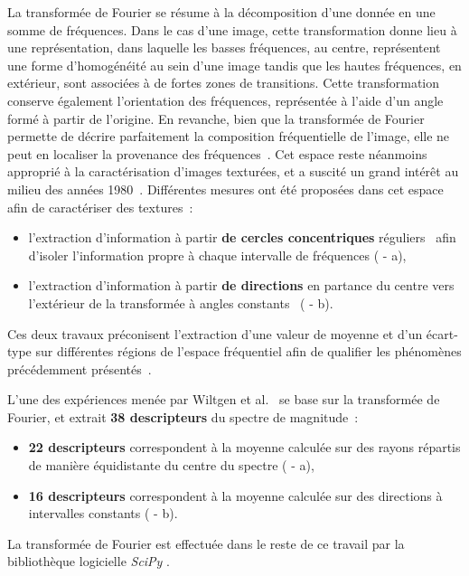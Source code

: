 La transformée de Fourier se résume à la décomposition d'une donnée en une somme de fréquences. Dans le cas d'une image, cette transformation donne lieu à une représentation, dans laquelle les basses fréquences, au centre, représentent une forme d'homogénéité au sein d'une image tandis que les hautes fréquences, en extérieur, sont associées à de fortes zones de transitions. Cette transformation conserve également l'orientation des fréquences, représentée à l'aide d'un angle formé à partir de l'origine. En revanche, bien que la transformée de Fourier permette de décrire parfaitement la composition fréquentielle de l'image, elle ne peut en localiser la provenance des fréquences~\cite{Wiltgen2008}. Cet espace reste néanmoins approprié à la caractérisation d'images texturées, et a suscité un grand intérêt au milieu des années 1980~\cite{Persoon1986}. Différentes mesures ont été proposées dans cet espace afin de caractériser des textures~:
\begin{itemize}
    \item l'extraction d'information à partir \textbf{de cercles concentriques} réguliers~\cite{Smach2008a, Wiltgen2008} afin d'isoler l'information propre à chaque intervalle de fréquences ( - a),
    \item l'extraction d'information à partir \textbf{de directions} en partance du centre vers l'extérieur de la transformée à angles constants~\cite{Wiltgen2008} ( - b).
\end{itemize}
Ces deux travaux préconisent l'extraction d'une valeur de moyenne et d'un écart-type sur différentes régions de l'espace fréquentiel afin de qualifier les phénomènes précédemment présentés~\cite{Smach2008a, Wiltgen2008}. 

L'une des expériences menée par Wiltgen et al.~\cite{Wiltgen2008} se base sur la transformée de Fourier, et extrait \textbf{38 descripteurs} du spectre de magnitude~:
\begin{itemize}
    \item \textbf{22 descripteurs} correspondent à la moyenne calculée sur des rayons répartis de manière équidistante du centre du spectre ( - a),
    \item \textbf{16 descripteurs} correspondent à la moyenne calculée sur des directions à intervalles constants ( - b).
\end{itemize}
La transformée de Fourier est effectuée dans le reste de ce travail par la bibliothèque logicielle \textit{SciPy} \cite{Virtanen2020}.\par

